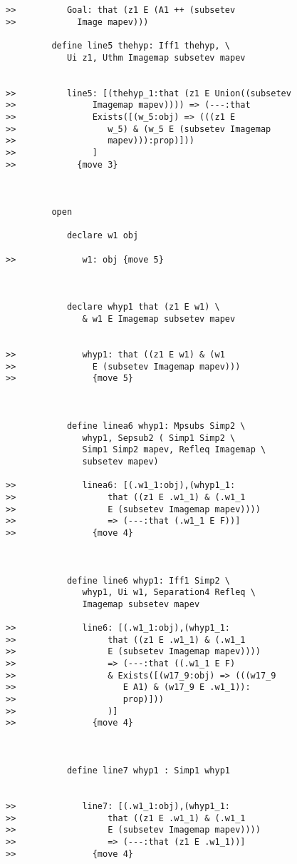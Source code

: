 \documentclass[12pt]{article}
\begin{document}
\begin{verbatim}
>>          Goal: that (z1 E (A1 ++ (subsetev
>>            Image mapev)))

         define line5 thehyp: Iff1 thehyp, \
            Ui z1, Uthm Imagemap subsetev mapev


>>          line5: [(thehyp_1:that (z1 E Union((subsetev
>>               Imagemap mapev)))) => (---:that
>>               Exists([(w_5:obj) => (((z1 E
>>                  w_5) & (w_5 E (subsetev Imagemap
>>                  mapev))):prop)]))
>>               ]
>>            {move 3}



         open

            declare w1 obj

>>             w1: obj {move 5}



            declare whyp1 that (z1 E w1) \
               & w1 E Imagemap subsetev mapev


>>             whyp1: that ((z1 E w1) & (w1
>>               E (subsetev Imagemap mapev)))
>>               {move 5}



            define linea6 whyp1: Mpsubs Simp2 \
               whyp1, Sepsub2 ( Simp1 Simp2 \
               Simp1 Simp2 mapev, Refleq Imagemap \
               subsetev mapev)

>>             linea6: [(.w1_1:obj),(whyp1_1:
>>                  that ((z1 E .w1_1) & (.w1_1
>>                  E (subsetev Imagemap mapev))))
>>                  => (---:that (.w1_1 E F))]
>>               {move 4}



            define line6 whyp1: Iff1 Simp2 \
               whyp1, Ui w1, Separation4 Refleq \
               Imagemap subsetev mapev

>>             line6: [(.w1_1:obj),(whyp1_1:
>>                  that ((z1 E .w1_1) & (.w1_1
>>                  E (subsetev Imagemap mapev))))
>>                  => (---:that ((.w1_1 E F)
>>                  & Exists([(w17_9:obj) => (((w17_9
>>                     E A1) & (w17_9 E .w1_1)):
>>                     prop)]))
>>                  )]
>>               {move 4}



            define line7 whyp1 : Simp1 whyp1


>>             line7: [(.w1_1:obj),(whyp1_1:
>>                  that ((z1 E .w1_1) & (.w1_1
>>                  E (subsetev Imagemap mapev))))
>>                  => (---:that (z1 E .w1_1))]
>>               {move 4}




\end{verbatim}
\end{document}
